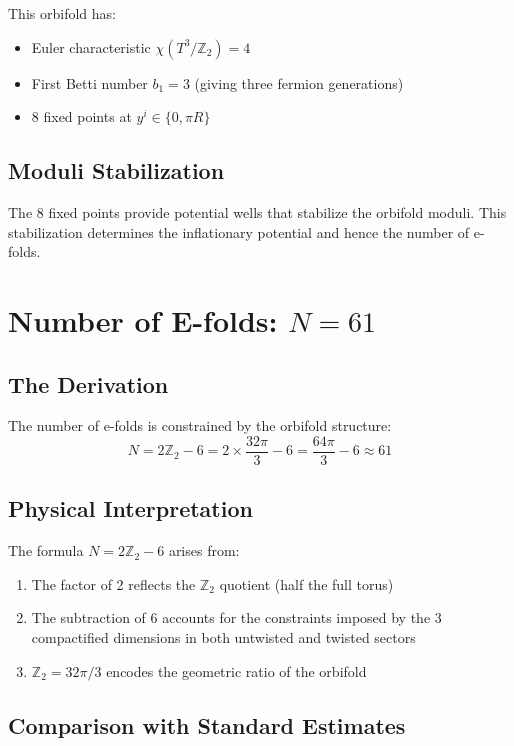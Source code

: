 \documentclass[12pt,a4paper]{article}
\begin{document}
This orbifold has:
\begin{itemize}
    \item Euler characteristic $\chi(T^3/\mathbb{Z}_2) = 4$
    \item First Betti number $b_1 = 3$ (giving three fermion generations)
    \item 8 fixed points at $y^i \in \{0, \pi R\}$
\end{itemize}

\subsection{Moduli Stabilization}

The 8 fixed points provide potential wells that stabilize the orbifold moduli. This stabilization determines the inflationary potential and hence the number of e-folds.

\section{Number of E-folds: $N = 61$}

\subsection{The Derivation}

The number of e-folds is constrained by the orbifold structure:
\begin{equation}
N = 2\mathbb{Z}_2 - 6 = 2 \times \frac{32\pi}{3} - 6 = \frac{64\pi}{3} - 6 \approx 61
\end{equation}

\subsection{Physical Interpretation}

The formula $N = 2\mathbb{Z}_2 - 6$ arises from:
\begin{enumerate}
    \item The factor of 2 reflects the $\mathbb{Z}_2$ quotient (half the full torus)
    \item The subtraction of 6 accounts for the constraints imposed by the 3 compactified dimensions in both untwisted and twisted sectors
    \item $\mathbb{Z}_2 = 32\pi/3$ encodes the geometric ratio of the orbifold
\end{enumerate}

\subsection{Comparison with Standard Estimates}
\end{document}
